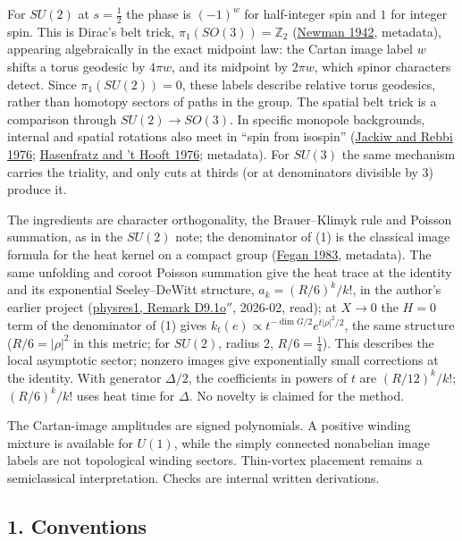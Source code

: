 \documentclass[11pt,a4paper]{article}
\begin{document}
For \(SU(2)\) at \(s=\frac12\) the phase is \((-1)^w\) for half-integer
spin and \(1\) for integer spin. This is Dirac's belt trick,
\(\pi_1(SO(3))=\mathbb Z_2\)
(\href{https://doi.org/10.1112/jlms/s1-17.3.173}{Newman 1942},
metadata), appearing algebraically in the exact midpoint law: the Cartan
image label \(w\) shifts a torus geodesic by \(4\pi w\), and its
midpoint by \(2\pi w\), which spinor characters detect. Since
\(\pi_1(SU(2))=0\), these labels describe relative torus geodesics,
rather than homotopy sectors of paths in the group. The spatial belt
trick is a comparison through \(SU(2)\to SO(3)\). In specific monopole
backgrounds, internal and spatial rotations also meet in ``spin from
isospin'' (\href{https://doi.org/10.1103/PhysRevLett.36.1116}{Jackiw and
Rebbi 1976};
\href{https://doi.org/10.1103/PhysRevLett.36.1119}{Hasenfratz and 't
Hooft 1976}; metadata). For \(SU(3)\) the same mechanism carries the
triality, and only cuts at thirds (or at denominators divisible by
\(3\)) produce it.

The ingredients are character orthogonality, the Brauer--Klimyk rule and
Poisson summation, as in the \(SU(2)\) note; the denominator of (1) is
the classical image formula for the heat kernel on a compact group
(\href{https://doi.org/10.4310/jdg/1214438176}{Fegan 1983}, metadata).
The same unfolding and coroot Poisson summation give the heat trace at
the identity and its exponential Seeley--DeWitt structure,
\(a_k=(R/6)^k/k!\), in the author's earlier project
(\href{https://github.com/arivero/physres1/blob/9e31f51/paper/main.md}{physres1,
Remark D9.1o\(''\)}, 2026-02, read); at \(X\to0\) the \(H=0\) term of
the denominator of (1) gives
\(k_t(e)\propto t^{-\dim G/2}e^{t|\rho|^2/2}\), the same structure
(\(R/6=|\rho|^2\) in this metric; for \(SU(2)\), radius 2,
\(R/6=\frac14\)). This describes the local asymptotic sector; nonzero
images give exponentially small corrections at the identity. With
generator \(\Delta/2\), the coefficients in powers of \(t\) are
\((R/12)^k/k!\); \((R/6)^k/k!\) uses heat time for \(\Delta\). No
novelty is claimed for the method.

The Cartan-image amplitudes are signed polynomials. A positive winding
mixture is available for \(U(1)\), while the simply connected nonabelian
image labels are not topological winding sectors. Thin-vortex placement
remains a semiclassical interpretation. Checks are internal written
derivations.

\hypertarget{conventions}{%
\subsection{1. Conventions}\label{conventions}}
\end{document}
